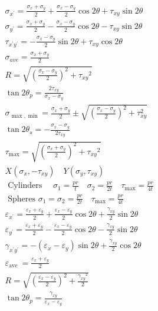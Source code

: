 \documentclass[10pt]{article}
\begin{document}
$$
\begin{aligned}
&\sigma_{x^{\prime}}=\frac{\sigma_x+\sigma_y}{2}+\frac{\sigma_x-\sigma_y}{2} \cos 2 \theta+\tau_{x y} \sin 2 \theta \\
&\sigma_{y^{\prime}}=\frac{\sigma_x+\sigma_y}{2}-\frac{\sigma_x-\sigma_y}{2} \cos 2 \theta-\tau_{x y} \sin 2 \theta \\
&\tau_{x^{\prime} y^{\prime}}=-\frac{\sigma_x-\sigma_y}{2} \sin 2 \theta+\tau_{x y} \cos 2 \theta \\
&\sigma_{a v e}=\frac{\sigma_x+\sigma_y}{2} \\
&R=\sqrt{\left(\frac{\sigma_x-\sigma_y}{2}\right)^2+\tau_{x y}{ }^2} \\
&\tan 2 \theta_p=\frac{2 \tau_{x y}}{\sigma_x-\sigma_y} \\
&\sigma_{\max , \min }=\frac{\sigma_x+\sigma_y}{2} \pm \sqrt{\left(\frac{\sigma_x-\sigma_y}{2}\right)^2+\tau_{x y}^2} \\
&\tan 2 \theta_s=-\frac{\sigma_x-\sigma_y}{2 \tau_{x y}} \\
&\tau_{\max }=\sqrt{\left(\frac{\sigma_x+\sigma_y}{2}\right)^2+\tau_{x y}{ }^2} \\
&X\left(\sigma_x,-\tau_{x y}\right) \quad Y\left(\sigma_y, \tau_{x y}\right) \\
&\text { Cylinders } \quad \sigma_1=\frac{p r}{t} \quad \sigma_2=\frac{p r}{2 t} \quad \tau_{\max }=\frac{p r}{4 t} \\
&\text { Spheres } \sigma_1=\sigma_2=\frac{p r}{2 t} \quad \tau_{\max }=\frac{p r}{4 t} \\
&\varepsilon_{x^{\prime}}=\frac{\varepsilon_x+\varepsilon_y}{2}+\frac{\varepsilon_x-\varepsilon_y}{2} \cos 2 \theta+\frac{\gamma_{x y}}{2} \sin 2 \theta \\
&\varepsilon_{y^{\prime}}=\frac{\varepsilon_x+\varepsilon_y}{2}-\frac{\varepsilon_x-\varepsilon_y}{2} \cos 2 \theta-\frac{\gamma_{x y}}{2} \sin 2 \theta \\
&\gamma_{x^{\prime} y^{\prime}}=-\left(\varepsilon_x-\varepsilon_y\right) \sin 2 \theta+\frac{\gamma_{x y}}{2} \cos 2 \theta \\
&\varepsilon_{\text {ave }}=\frac{\varepsilon_x+\varepsilon_y}{2} \\
&R=\sqrt{\left(\frac{\varepsilon_x-\varepsilon_y}{2}\right)^2+\frac{\gamma_{x y}{ }^2}{2}} \\
&\tan 2 \theta_p=\frac{\gamma_{x y}}{\varepsilon_x-\varepsilon_y} \\
&
\end{aligned}
$$
\end{document}
